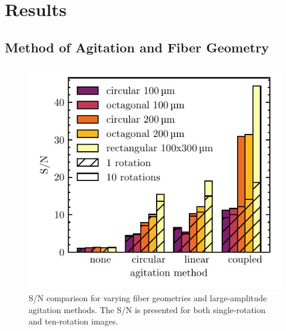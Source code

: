 \documentclass[twocolumn]{emulateapj}
\begin{document}
\section{Results}
\label{sec:results}

\subsection{Method of Agitation and Fiber Geometry}
\label{subsec:ag_snr}

\begin{figure}
\centering
	\includegraphics[width=\columnwidth]{ag_snr.pdf}
	\caption{S/N comparison for varying fiber geometries and large-amplitude agitation methods. The S/N is presented for both single-rotation and ten-rotation images.}
\label{fig:ag_snr}
\end{figure}
\end{document}
